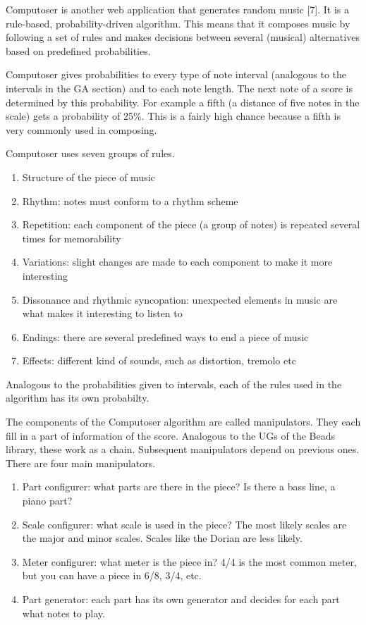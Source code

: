 \documentclass[12pt]{article}
\begin{document}
Computoser is another web application that generates random music [7]. It is a rule-based, probability-driven algorithm. This means that it composes music by following a set of rules and makes decisions between several (musical) alternatives based on predefined probabilities.
\newline

Computoser gives probabilities to every type of note interval (analogous to the intervals in the GA section) and to each note length. The next note of a score is determined by this probability.
For example a fifth (a distance of five notes in the scale) gets a probability of 25\%. This is a fairly high chance because a fifth is very commonly used in composing.
\newline

Computoser uses seven groups of rules.
\begin{enumerate}
\item Structure of the piece of music 
\item Rhythm: notes must conform to a rhythm scheme
\item Repetition: each component of the piece (a group of notes) is repeated several times for memorability 
\item Variations: slight changes are made to each component to make it more interesting
\item Dissonance and rhythmic syncopation: unexpected elements in music are what makes it interesting to listen to
\item Endings: there are several predefined ways to end a piece of music
\item Effects: different kind of sounds, such as distortion, tremolo etc
\end{enumerate}

Analogous to the probabilities given to intervals, each of the rules used in the algorithm has its own probabilty.
\newline

The components of the Computoser algorithm are called manipulators. They each fill in a part of information of the score. Analogous to the UGs of the Beads library, these work as a chain. Subsequent manipulators depend on previous ones. There are four main manipulators.

\begin{enumerate}
\item Part configurer: what parts are there in the piece? Is there a bass line, a piano part?
\item Scale configurer: what scale is used in the piece? The most likely scales are the major and minor scales. Scales like the Dorian are less likely.
\item Meter configurer: what meter is the piece in? 4/4 is the most common meter, but you can have a piece in 6/8, 3/4, etc.
\item Part generator: each part has its own generator and decides for each part what notes to play.
\end{enumerate}
 
\end{document}
